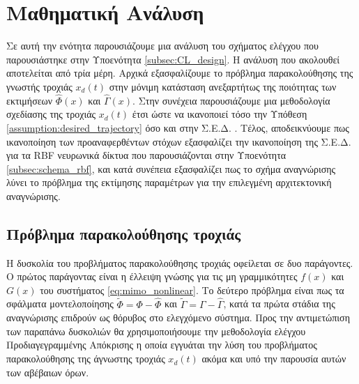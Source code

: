 \section{Μαθηματική Ανάλυση}
Σε αυτή την ενότητα παρουσιάζουμε μια ανάλυση του σχήματος ελέγχου που παρουσιάστηκε στην Υποενότητα \ref{subsec:CL_design}. Η ανάλυση που ακολουθεί αποτελείται από τρία μέρη. Αρχικά εξασφαλίζουμε το πρόβλημα παρακολούθησης της γνωστής τροχιάς $x_d(t)$ στην μόνιμη κατάσταση ανεξαρτήτως της ποιότητας των εκτιμήσεων $\hat{\Phi}(x)$ και $\hat{\Gamma}(x)$. Στην συνέχεια παρουσιάζουμε μια μεθοδολογία σχεδίασης της τροχιάς $x_d(t)$ έτσι ώστε να ικανοποιεί τόσο την Υπόθεση \ref{assumption:desired_trajectory} όσο και στην Σ.Ε.Δ. . Τέλος, αποδεικνύουμε πως ικανοποίηση των προαναφερθέντων στόχων εξασφαλίζει την ικανοποίηση της Σ.Ε.Δ. για τα RBF νευρωνικά δίκτυα που παρουσιάζονται στην Υποενότητα \ref{subsec:schema_rbf}, και κατά συνέπεια εξασφαλίζει πως το σχήμα αναγνώρισης λύνει το πρόβλημα της εκτίμησης παραμέτρων για την επιλεγμένη αρχιτεκτονική αναγνώρισης.

%

\subsection{Πρόβλημα παρακολούθησης τροχιάς} \label{subsec:traj_tracking}
Η δυσκολία του προβλήματος παρακολούθησης τροχιάς οφείλεται σε δυο παράγοντες. Ο πρώτος παράγοντας είναι η έλλειψη γνώσης για τις μη γραμμικότητες $f(x)$ και $G(x)$ του συστήματος \eqref{eq:mimo_nonlinear}. Το δεύτερο πρόβλημα είναι πως τα σφάλματα μοντελοποίησης  $\tilde{\Phi} = \Phi - \hat{\Phi}$ και $\tilde{\Gamma} = \Gamma - \hat{\Gamma}$, κατά τα πρώτα στάδια της αναγνώρισης επιδρούν ως θόρυβος στο ελεγχόμενο σύστημα. Προς την αντιμετώπιση των παραπάνω δυσκολιών θα χρησιμοποιήσουμε την μεθοδολογία ελέγχου Προδιαγεγραμμένης Απόκρισης η οποία εγγυάται την λύση του προβλήματος παρακολούθησης της άγνωστης τροχιάς $x_d(t)$ ακόμα και υπό την παρουσία αυτών των αβέβαιων όρων.

